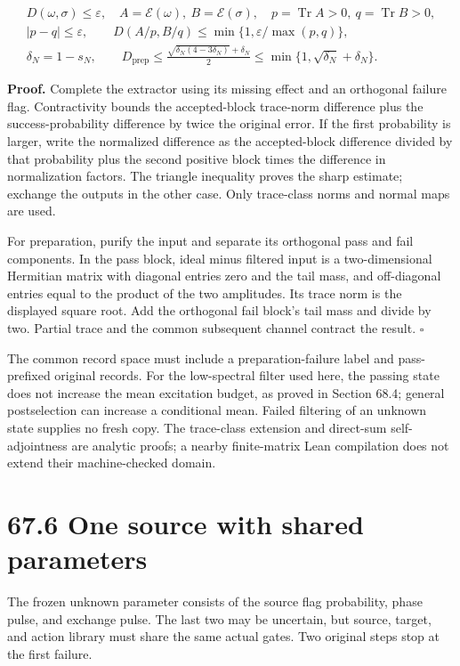 \documentclass[
  11pt,
  oneside]{book}
\begin{document}
\[
\begin{gathered}
D(\omega,\sigma)\le\varepsilon,\quad
A=\mathcal E(\omega),\ B=\mathcal E(\sigma),\quad
p=\operatorname{Tr}A>0,\ q=\operatorname{Tr}B>0,\\
|p-q|\le\varepsilon,\qquad
D(A/p,B/q)\le\min\{1,\varepsilon/\max(p,q)\},\\
\delta_N=1-s_N,\qquad
D_{\mathrm{prep}}\le
\frac{\sqrt{\delta_N(4-3\delta_N)}+\delta_N}{2}
\le\min\{1,\sqrt{\delta_N}+\delta_N\}.
\end{gathered}
\]

\textbf{Proof.} Complete the extractor using its missing effect and an
orthogonal failure flag. Contractivity bounds the accepted-block
trace-norm difference plus the success-probability difference by twice
the original error. If the first probability is larger, write the
normalized difference as the accepted-block difference divided by that
probability plus the second positive block times the difference in
normalization factors. The triangle inequality proves the sharp
estimate; exchange the outputs in the other case. Only trace-class norms
and normal maps are used.

For preparation, purify the input and separate its orthogonal pass and
fail components. In the pass block, ideal minus filtered input is a
two-dimensional Hermitian matrix with diagonal entries zero and the tail
mass, and off-diagonal entries equal to the product of the two
amplitudes. Its trace norm is the displayed square root. Add the
orthogonal fail block's tail mass and divide by two. Partial trace and
the common subsequent channel contract the result. \(\square\)

The common record space must include a preparation-failure label and
pass-prefixed original records. For the low-spectral filter used here,
the passing state does not increase the mean excitation budget, as
proved in Section 68.4; general postselection can increase a conditional
mean. Failed filtering of an unknown state supplies no fresh copy. The
trace-class extension and direct-sum self-adjointness are analytic
proofs; a nearby finite-matrix Lean compilation does not extend their
machine-checked domain.

\section{67.6 One source with shared parameters}

The frozen unknown parameter consists of the source flag probability,
phase pulse, and exchange pulse. The last two may be uncertain, but
source, target, and action library must share the same actual gates. Two
original steps stop at the first failure.
\end{document}
